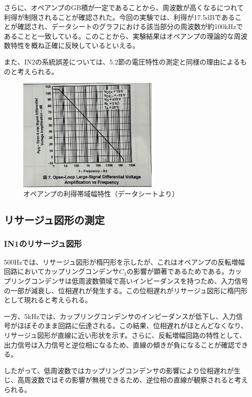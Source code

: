 \documentclass{jlreq}
\numberwithin{equation}{section}
\begin{document}
さらに、オペアンプのGB積が一定であることから、周波数が高くなるにつれて利得が制限されることが確認された。今回の実験では、利得が17.5dBであることが確認され、データシートのグラフにおける該当部分の周波数が約100kHzであることと一致している。このことから、実験結果はオペアンプの理論的な周波数特性を概ね正確に反映しているといえる。

また、IN2の系統誤差については、5.2節の電圧特性の測定と同様の理由によるものと考えられる。

\begin{figure}[H]
  \centering
  \includegraphics[width=70mm, keepaspectratio]{data.png}
  \caption{オペアンプの利得帯域幅特性（データシートより）}
\end{figure}

\subsection{リサージュ図形の測定}
\subsubsection{IN1のリサージュ図形}
500Hzでは、リサージュ図形が楕円形を示したが、これはオペアンプの反転増幅回路においてカップリングコンデンサ\(C_3\)の影響が顕著であるためである。カップリングコンデンサは低周波数領域で高いインピーダンスを持つため、入力信号の一部が減衰し、位相遅れが発生する。この位相遅れがリサージュ図形に楕円形として現れると考えられる。

一方、5kHzでは、カップリングコンデンサのインピーダンスが低下し、入力信号がほぼそのまま回路に伝達される。この結果、位相遅れがほとんどなくなり、リサージュ図形が直線に近い形状を示す。さらに、反転増幅回路の特性として、出力信号は入力信号と逆位相になるため、直線の傾きが負になることが確認できる。

したがって、低周波数ではカップリングコンデンサの影響により位相遅れが生じ、高周波数ではその影響が無視できるため、逆位相の直線が観察されると考えられる。
\end{document}
